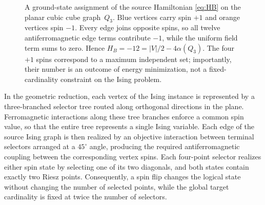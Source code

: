\documentclass[12pt,a4paper]{article}
\begin{document}
\begin{figure}[htbp]
\centering
{}
\caption{A ground-state assignment of the source Hamiltonian \eqref{eq:HB} on the planar cubic cube graph~$Q_3$.  Blue vertices carry spin $+1$ and orange vertices spin $-1$.  Every edge joins opposite spins, so all twelve antiferromagnetic edge terms contribute $-1$, while the uniform field term sums to zero.  Hence $H_B=-12=|V|/2-4\alpha(Q_3)$.  The four $+1$ spins correspond to a maximum independent set; importantly, their number is an outcome of energy minimization, not a fixed-cardinality constraint on the Ising problem.}
\label{fig:ising-cardinality-example}
\end{figure}

In the geometric reduction, each vertex of the Ising instance is represented by a three-branched selector tree routed along orthogonal directions in the plane.  Ferromagnetic interactions along these tree branches enforce a common spin value, so that the entire tree represents a single Ising variable.  Each edge of the source Ising graph is then realized by an objective interaction between terminal selectors arranged at a $45^\circ$ angle, producing the required antiferromagnetic coupling between the corresponding vertex spins.
Each four-point selector realizes either spin state by selecting one of its two diagonals, and both states contain exactly two Riesz points. Consequently, a spin flip changes the logical state without changing the number of selected points, while the global target cardinality is fixed at twice the number of selectors. 
\end{document}
